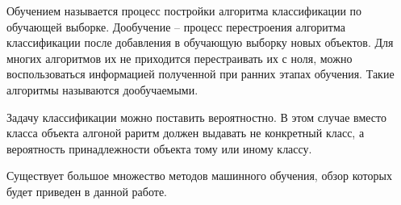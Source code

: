 Обучением называется процесс постройки алгоритма классификации по обучающей выборке. Дообучение – процесс перестроения алгоритма классификации после добавления в обучающую выборку новых объектов. Для многих алгоритмов их не приходится перестраивать их с ноля, можно воспользоваться информацией полученной при ранних этапах обучения. Такие алгоритмы называются дообучаемыми.

Задачу классификации можно поставить вероятностно. В этом случае вместо класса объекта алгоной раритм должен выдавать не конкретный класс, а вероятность принадлежности объекта тому или иному классу.

Существует большое множество методов машинного обучения, обзор которых будет приведен в данной работе.
